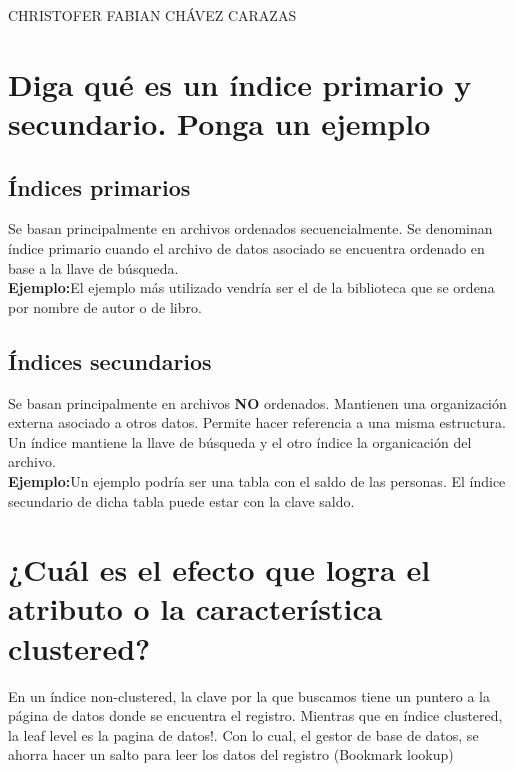 \documentclass[a4paper,12pt]{article}
\begin{document}
\begin{LARGE}
 CHRISTOFER FABIAN CHÁVEZ CARAZAS
\end{LARGE}

\section{Diga qué es un índice primario y secundario. Ponga un ejemplo}

  \subsection{Índices primarios}
  
    Se basan principalmente en archivos ordenados secuencialmente.
    Se denominan índice primario cuando el archivo de datos asociado 
    se encuentra ordenado en base a la llave de búsqueda. \\
    
    \textbf{Ejemplo:}El ejemplo más utilizado vendría ser el 
    de la biblioteca que se ordena por nombre de autor o de libro.
    
    
  \subsection{Índices secundarios}
  
    Se basan principalmente en archivos \textbf{NO} ordenados.
    Mantienen una organización externa asociado a otros datos.
    Permite hacer referencia a una misma estructura.
    Un índice mantiene la llave de búsqueda y el otro índice la organicación del archivo. \\
    
    \textbf{Ejemplo:}Un ejemplo podría ser una tabla con el saldo de las personas.
    El índice secundario de dicha tabla puede estar con la clave saldo.
    
\section{¿Cuál es el efecto que logra el atributo o la característica
	  clustered?}
	  En un índice non-clustered, la clave por la que buscamos tiene un puntero a la página de datos donde se encuentra el registro. Mientras que en índice clustered, la leaf level es la pagina de datos!. Con lo cual, el gestor de base de datos, se ahorra hacer un salto para leer los datos del registro (Bookmark lookup)
    
    \newpage
    
\end{document}
